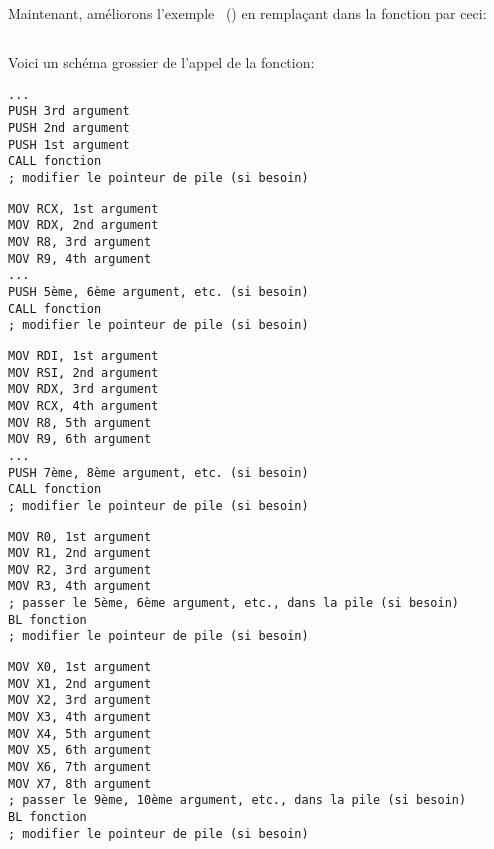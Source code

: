 ﻿\section{\PrintfSeveralArgumentsSectionName}

Maintenant, améliorons l'exemple \IT{\HelloWorldSectionName}~()
en remplaçant \printf dans la fonction \main par ceci:







\subsection{\Conclusion{}}

Voici un schéma grossier de l'appel de la fonction:

\begin{lstlisting}[caption=x86,style=customasmx86]
...
PUSH 3rd argument
PUSH 2nd argument
PUSH 1st argument
CALL fonction
; modifier le pointeur de pile (si besoin)
\end{lstlisting}

\begin{lstlisting}[caption=x64 (MSVC),style=customasmx86]
MOV RCX, 1st argument
MOV RDX, 2nd argument
MOV R8, 3rd argument
MOV R9, 4th argument
...
PUSH 5ème, 6ème argument, etc. (si besoin)
CALL fonction
; modifier le pointeur de pile (si besoin)
\end{lstlisting}

\begin{lstlisting}[caption=x64 (GCC),style=customasmx86]
MOV RDI, 1st argument
MOV RSI, 2nd argument
MOV RDX, 3rd argument
MOV RCX, 4th argument
MOV R8, 5th argument
MOV R9, 6th argument
...
PUSH 7ème, 8ème argument, etc. (si besoin)
CALL fonction
; modifier le pointeur de pile (si besoin)
\end{lstlisting}

\begin{lstlisting}[caption=ARM,style=customasmARM]
MOV R0, 1st argument
MOV R1, 2nd argument
MOV R2, 3rd argument
MOV R3, 4th argument
; passer le 5ème, 6ème argument, etc., dans la pile (si besoin)
BL fonction
; modifier le pointeur de pile (si besoin)
\end{lstlisting}

\begin{lstlisting}[caption=ARM64,style=customasmARM]
MOV X0, 1st argument
MOV X1, 2nd argument
MOV X2, 3rd argument
MOV X3, 4th argument
MOV X4, 5th argument
MOV X5, 6th argument
MOV X6, 7th argument
MOV X7, 8th argument
; passer le 9ème, 10ème argument, etc., dans la pile (si besoin)
BL fonction
; modifier le pointeur de pile (si besoin)
\end{lstlisting}

